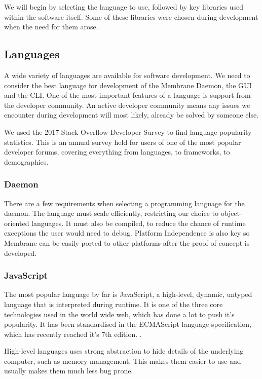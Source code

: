 \documentclass[11pt, a4paper, twocolumn, twoside]{report}
\begin{document}
We will begin by selecting the language to use, followed by key libraries used within the software itself. Some of these libraries were chosen during development when the need for them arose.

\subsection{Languages}

A wide variety of languages are available for software development. We need to consider the best language for development of the Membrane Daemon, the GUI and the CLI. One of the most important features of a language is support from the developer community. An active developer community means any issues we encounter during development will most likely, already be solved by someone else.

We used the 2017 Stack Overflow Developer Survey \citep{stackoverflow2017survey} to find language popularity statistics. This is an annual survey held for users of one of the most popular developer forums, covering everything from languages, to frameworks, to demographics.

\subsubsection{Daemon}

There are a few requirements when selecting a programming language for the daemon. The language must scale efficiently, restricting our choice to object-oriented languages. It must also be compiled, to reduce the chance of runtime exceptions the user would need to debug. Platform Independence is also key so Membrane can be easily ported to other platforms after the proof of concept is developed.

\subsubsection{JavaScript}

The most popular language by far is JavaScript, a high-level, dynamic, untyped language that is interpreted during runtime. \citep{flanagan2011javascript} It is one of the three core technologies used in the world wide web, which has done a lot to push it's popularity. It has been standardised in the ECMAScript language specification, which has recently reached it's 7th edition. \citep{stefanov2010javascript}.

High-level languages uses strong abstraction to hide details of the underlying computer, such as memory management. This makes them easier to use and usually makes them much less bug prone.
\end{document}
